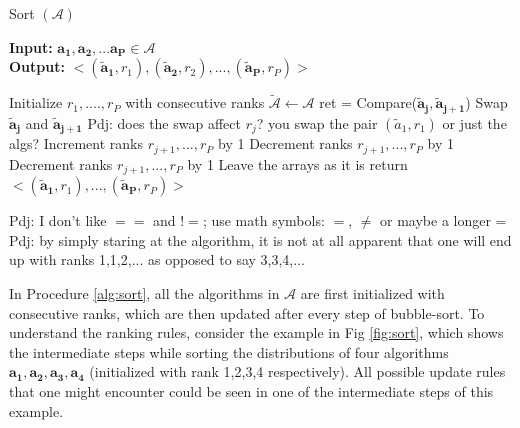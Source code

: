 \documentclass[conference]{IEEEtran}
\newcommand{\p}[1]{{\color{blue} Pdj: #1}}
\begin{document}
\begin{algorithm}
	\caption{Sort $(\mathcal{A})$ }
	\label{alg:sort}
	\hspace*{\algorithmicindent} \textbf{Input: } $ \mathbf{a_1},\mathbf{a_2},...\mathbf{a_P} \in \mathcal{A}$ \\
	\hspace*{\algorithmicindent} \textbf{Output: } $ < (\mathbf{\tilde{a}_1},r_1), (\mathbf{\tilde{a}_2}, r_2), ..., (\mathbf{\tilde{a}_P},r_P) > $
	\begin{algorithmic}[1] 
		\State Initialize $r_1,....,r_P$ with consecutive ranks 
		\State $\tilde{\mathcal{A}} \leftarrow \mathcal{A}$
		\State ret = Compare($\mathbf{\tilde{a}_j}, \mathbf{\tilde{a}_{j+1}}$)
		\State Swap $\mathbf{\tilde{a}_{j}}$ and $\mathbf{\tilde{a}_{j+1}}$
                       \p{does the swap affect $r_j$? you swap the pair $(\tilde{a}_1,r_1)$ or just the algs?}
		\State Increment ranks $r_{j+1}, ..., r_P$ by 1
		\EndIf
		\Else
		\State Decrement ranks $r_{j+1}, ..., r_P$ by 1
		\EndIf
		\EndIf
		\State Decrement ranks $r_{j+1}, ..., r_P$ by 1
		\EndIf
		\State Leave the arrays as it is
		\EndIf		
		\EndFor
		\EndFor
		\State return $< (\mathbf{\tilde{a}_1},r_1), ..., (\mathbf{\tilde{a}_P},r_P) >$
              \end{algorithmic}
              \p{I don't like $==$ and $!=$; use math symbols: $=$, $\ne$ or maybe a longer =}
              \p{by simply staring at the algorithm, it is not at all apparent that one will end up with ranks
                1,1,2,... as opposed to say 3,3,4,...}
\end{algorithm}
In Procedure \ref{alg:sort}, all the algorithms in $\mathcal{A}$ are first initialized with consecutive ranks, which are then updated after every step of bubble-sort. To understand the ranking rules, consider the example in Fig \ref{fig:sort}, which shows the intermediate steps while sorting the distributions of four algorithms $\mathbf{a_1}, \mathbf{a_2}, \mathbf{a_3},\mathbf{a_4}$ (initialized with rank 1,2,3,4 respectively). All possible update rules that one might encounter could be seen in one of the intermediate steps of this example.
\end{document}
